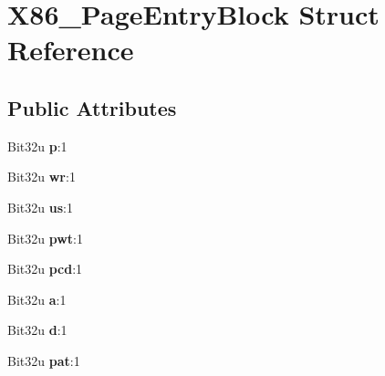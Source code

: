\hypertarget{structX86__PageEntryBlock}{\section{X86\-\_\-\-Page\-Entry\-Block Struct Reference}
\label{structX86__PageEntryBlock}
}
\subsection*{Public Attributes}
\begin{DoxyCompactItemize}
\item 
\hypertarget{structX86__PageEntryBlock_aabad94046eba1e359bff2b7b7d895e1f}{Bit32u {\bfseries p}\-:1}\label{structX86__PageEntryBlock_aabad94046eba1e359bff2b7b7d895e1f}

\item 
\hypertarget{structX86__PageEntryBlock_a2f463c76da193e2df0658522324bc012}{Bit32u {\bfseries wr}\-:1}\label{structX86__PageEntryBlock_a2f463c76da193e2df0658522324bc012}

\item 
\hypertarget{structX86__PageEntryBlock_ad6957f0c3fc0b2cbf633defaf9b8282e}{Bit32u {\bfseries us}\-:1}\label{structX86__PageEntryBlock_ad6957f0c3fc0b2cbf633defaf9b8282e}

\item 
\hypertarget{structX86__PageEntryBlock_ad38b6010e669c76ccd81656e85360961}{Bit32u {\bfseries pwt}\-:1}\label{structX86__PageEntryBlock_ad38b6010e669c76ccd81656e85360961}

\item 
\hypertarget{structX86__PageEntryBlock_a80fbf277450c5d385b4b82b946d17646}{Bit32u {\bfseries pcd}\-:1}\label{structX86__PageEntryBlock_a80fbf277450c5d385b4b82b946d17646}

\item 
\hypertarget{structX86__PageEntryBlock_add5f72fb07204d76ae9214eb1ed4f7c5}{Bit32u {\bfseries a}\-:1}\label{structX86__PageEntryBlock_add5f72fb07204d76ae9214eb1ed4f7c5}

\item 
\hypertarget{structX86__PageEntryBlock_a44568d7b8c1ae2c961812f3e04e6ea57}{Bit32u {\bfseries d}\-:1}\label{structX86__PageEntryBlock_a44568d7b8c1ae2c961812f3e04e6ea57}

\item 
\hypertarget{structX86__PageEntryBlock_aa85f39f369e8e88bd05f7d6693db8342}{Bit32u {\bfseries pat}\-:1}\label{structX86__PageEntryBlock_aa85f39f369e8e88bd05f7d6693db8342}


\end{DoxyCompactItemize}
